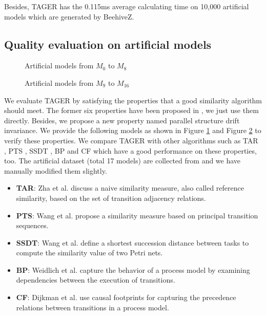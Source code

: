\documentclass{llncs}
\begin{document}
Besides, TAGER has the 0.115ms average calculating time on 10,000 artificial models which are generated by BeehiveZ. 

\subsection{Quality evaluation on artificial models}\label{criterionResult}
\begin{figure}[!htb]
\centering
{}
\caption{Artificial models from $M_{0}$ to $M_{8}$\label{propertyModels1}}
\end{figure}
\begin{figure}[!htb]
\centering
{}
\caption{Artificial models from $M_{9}$ to $M_{16}$\label{propertyModels2}}
\end{figure}

We evaluate TAGER by satisfying the properties that a good similarity algorithm should meet. The former six properties have been proposed in \cite{wang2013ssdt}, we just use them directly. Besides, we propose a new property named parallel structure drift invariance. We provide the following models as shown in Figure \ref{propertyModels1} and Figure \ref{propertyModels2} to verify these properties. We compare TAGER with other algorithms such as TAR \cite{zha2010workflow}, PTS \cite{wang2010behavioral}, SSDT \cite{wang2013ssdt}, BP \cite{weidlich2011efficient} and CF \cite{dijkman2011similarity} which have a good performance on these properties, too.
The artificial dataset (total 17 models) are collected from \cite{becker2012comparative,wang2013ssdt} and we have manually modified them slightly.

\begin{itemize}
\item \textbf{TAR}: Zha et al. \cite{zha2010workflow} discuss a naive similarity measure, also called reference similarity, based on the set of transition adjacency relations.
\item \textbf{PTS}: Wang et al. \cite{wang2010behavioral} propose a similarity measure based on principal transition sequences.
\item \textbf{SSDT}: Wang et al. \cite{wang2013ssdt} define a shortest succession distance between tasks to compute the similarity value of two Petri nets.
\item \textbf{BP}: Weidlich et al. \cite{weidlich2011efficient} capture the behavior of a process model by examining dependencies between the execution of transitions.
\item \textbf{CF}: Dijkman et al. \cite{dijkman2011similarity} use causal footprints for capturing the precedence relations between transitions in a process model.
\end{itemize}
\end{document}
